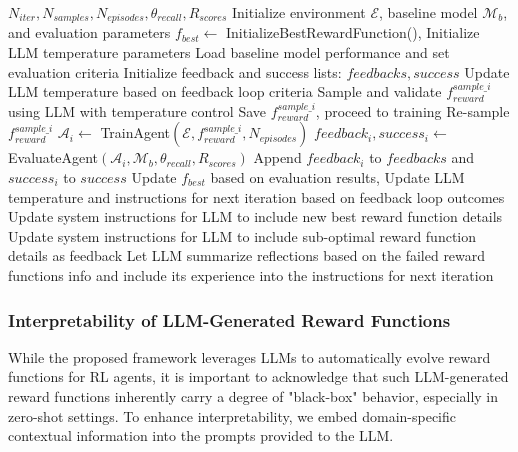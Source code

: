 \documentclass[11pt]{article}
\begin{document}
\begin{algorithm}
\caption{LLM-based Reward Function Optimization for RL Agent}
\label{alg:LLM-RL alg}
{\tiny
\begin{algorithmic}[1]
\REQUIRE $N_{iter}, N_{samples}, N_{episodes}, \theta_{recall}, R_{scores}$
\STATE Initialize environment $\mathcal{E}$, baseline model $\mathcal{M}_b$, and evaluation parameters
\STATE $f_{best} \leftarrow$ InitializeBestRewardFunction(), Initialize LLM temperature parameters
\STATE Load baseline model performance and set evaluation criteria
    \STATE Initialize feedback and success lists: $feedbacks, success$
    \STATE Update LLM temperature based on feedback loop criteria
        \STATE Sample and validate $f_{reward}^{sample\_i}$ using LLM with temperature control
            \STATE Save $f_{reward}^{sample\_i}$, proceed to training
        \ELSE
            \STATE Re-sample $f_{reward}^{sample\_i}$
        \ENDIF
    \ENDFOR
        \STATE $\mathcal{A}_i \leftarrow$ TrainAgent$(\mathcal{E}, f_{reward}^{sample\_i}, N_{episodes})$
        \STATE $feedback_i, success_i \leftarrow$ EvaluateAgent$(\mathcal{A}_i, \mathcal{M}_b, \theta_{recall}, R_{scores})$
        \STATE Append $feedback_i$ to $feedbacks$ and $success_i$ to $success$
    \ENDFOR
    \STATE Update $f_{best}$ based on evaluation results, Update LLM temperature and instructions for next iteration based on feedback loop outcomes
        \STATE Update system instructions for LLM to include new best reward function details
        \STATE Update system instructions for LLM to include sub-optimal reward function details as feedback
    \ELSE
        \STATE Let LLM summarize reflections based on the failed reward functions info and include its experience into the instructions for next iteration
    \ENDIF
\ENDFOR
\end{algorithmic}
}
\end{algorithm}


\subsubsection{Interpretability of LLM-Generated Reward Functions}

While the proposed framework leverages LLMs to automatically evolve reward functions for RL agents, it is important to acknowledge that such LLM-generated reward functions inherently carry a degree of "black-box" behavior, especially in zero-shot settings. To enhance interpretability, we embed domain-specific contextual information into the prompts provided to the LLM.
\end{document}
